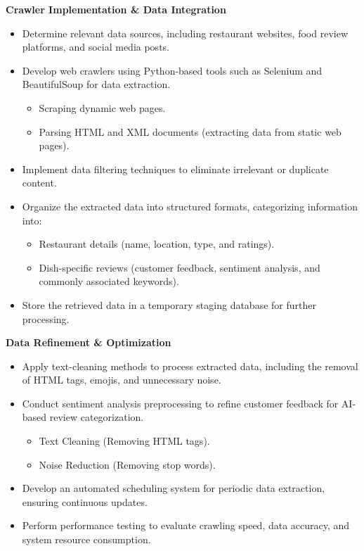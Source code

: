 \textbf{Crawler Implementation \& Data Integration}
\begin{itemize}
\item Determine relevant data sources, including restaurant websites, food review platforms, and social media posts.
\item Develop web crawlers using Python-based tools such as Selenium and BeautifulSoup for data extraction.
	\begin{itemize}
	\item Scraping dynamic web pages.
	\item Parsing HTML and XML documents (extracting data from static web pages).
	\end{itemize}
\item Implement data filtering techniques to eliminate irrelevant or duplicate content.
\item Organize the extracted data into structured formats, categorizing information into:
	\begin{itemize}
	\item Restaurant details (name, location, type, and ratings).
	\item Dish-specific reviews (customer feedback, sentiment analysis, and commonly associated keywords).
	\end{itemize}
\item Store the retrieved data in a temporary staging database for further processing.
\end{itemize}

\textbf{Data Refinement \& Optimization}
\begin{itemize}
\item Apply text-cleaning methods to process extracted data, including the removal of HTML tags, emojis, and unnecessary noise.
\item Conduct sentiment analysis preprocessing to refine customer feedback for AI-based review categorization.
	\begin{itemize}
	\item Text Cleaning (Removing HTML tags).
	\item Noise Reduction (Removing stop words).
	\end{itemize}
\item Develop an automated scheduling system for periodic data extraction, ensuring continuous updates.
\item Perform performance testing to evaluate crawling speed, data accuracy, and system resource consumption.
\end{itemize}

